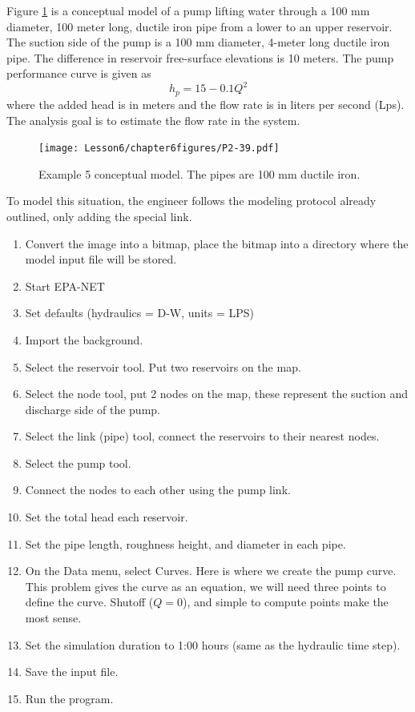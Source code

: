 Figure \ref{fig:P2-39.pdf} is a conceptual model of a pump lifting water through a 100 mm diameter, 100 meter long, ductile iron pipe from a lower to an upper reservoir.  The suction side of the pump is a 100 mm diameter, 4-meter long ductile iron pipe.  The difference in reservoir free-surface elevations is 10 meters.  The pump performance curve is given as
\begin{equation}
h_p = 15 - 0.1 Q^2
\end{equation}
where the added head is in meters and the flow rate is in liters per second (Lps).  The analysis goal is to estimate the flow rate in the system.
\begin{figure}[htbp] %
   \centering
   \texttt{[image: Lesson6/chapter6figures/P2-39.pdf]} 
   \caption{Example 5 conceptual model.  The pipes are 100 mm ductile iron.}
   \label{fig:P2-39.pdf}
\end{figure}
\newpage
To model this situation, the engineer follows the modeling protocol already outlined, only adding the special link.
\begin{enumerate}
\item Convert the image into a bitmap, place the bitmap into a directory where the model input file will be stored.
\item Start EPA-NET
\item Set defaults (hydraulics = D-W,  units = LPS)
\item Import the background.
\item Select the reservoir tool.  Put two reservoirs on the map.
\item Select the node tool, put 2 nodes on the map, these represent the suction and discharge side of the pump.
\item Select the link (pipe) tool, connect the reservoirs to their nearest nodes.  
\item Select the pump tool.
\item Connect the nodes to each other using the pump link.
\item Set the total head each reservoir.
\item Set the pipe length, roughness height, and diameter in each pipe.
\item On the Data menu, select Curves.  Here is where we create the pump curve.   This problem gives the curve as an equation, we will need three points to define the curve.   Shutoff ($Q=0$), and simple to compute points make the most sense.
\item Set the simulation duration to 1:00 hours (same as the hydraulic time step).
\item Save the input file.
\item Run the program.   
\end{enumerate}

